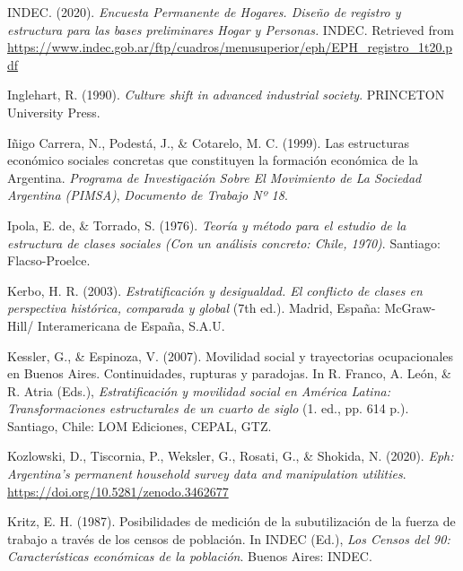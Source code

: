 \documentclass[
]{article}
\newlength{\cslhangindent}
\newlength{\cslentryspacingunit} %
\newenvironment{CSLReferences}[2] %
 {%
  \setlength{\parindent}{0pt}
  \ifodd #1
  \let\oldpar\par
  \def\par{\hangindent=\cslhangindent\oldpar}
  \fi
  \setlength{\parskip}{#2\cslentryspacingunit}
 }%
 {}
\begin{document}
\begin{CSLReferences}{1}{0}
\leavevmode{}%
INDEC. (2020). \emph{Encuesta {Permanente} de {Hogares}. {Diseño} de registro y estructura para las bases preliminares {Hogar} y {Personas}.} INDEC. Retrieved from \url{https://www.indec.gob.ar/ftp/cuadros/menusuperior/eph/EPH_registro_1t20.pdf}

\leavevmode{}%
Inglehart, R. (1990). \emph{Culture shift in advanced industrial society}. PRINCETON University Press.

\leavevmode{}%
Iñigo Carrera, N., Podestá, J., \& Cotarelo, M. C. (1999). Las estructuras económico sociales concretas que constituyen la formación económica de la {Argentina}. \emph{Programa de Investigación Sobre El Movimiento de La Sociedad Argentina (PIMSA)}, \emph{Documento de Trabajo Nº 18}.

\leavevmode{}%
Ipola, E. de, \& Torrado, S. (1976). \emph{Teoría y método para el estudio de la estructura de clases sociales ({Con} un análisis concreto: {Chile}, 1970)}. Santiago: Flacso-Proelce.

\leavevmode{}%
Kerbo, H. R. (2003). \emph{Estratificación y desigualdad. {El} conflicto de clases en perspectiva histórica, comparada y global} (7th ed.). Madrid, España: McGraw-Hill/ Interamericana de España, S.A.U.

\leavevmode{}%
Kessler, G., \& Espinoza, V. (2007). Movilidad social y trayectorias ocupacionales en {Buenos} {Aires}. {Continuidades}, rupturas y paradojas. In R. Franco, A. León, \& R. Atria (Eds.), \emph{Estratificación y movilidad social en {América} {Latina}: Transformaciones estructurales de un cuarto de siglo} (1. ed., pp. 614 p.). Santiago, Chile: LOM Ediciones, CEPAL, GTZ.

\leavevmode{}%
Kozlowski, D., Tiscornia, P., Weksler, G., Rosati, G., \& Shokida, N. (2020). \emph{Eph: Argentina's permanent household survey data and manipulation utilities}. \url{https://doi.org/10.5281/zenodo.3462677}

\leavevmode{}%
Kritz, E. H. (1987). Posibilidades de medición de la subutilización de la fuerza de trabajo a través de los censos de población. In INDEC (Ed.), \emph{Los {Censos} del 90: Características económicas de la población}. Buenos Aires: INDEC.


\end{CSLReferences}
\end{document}
